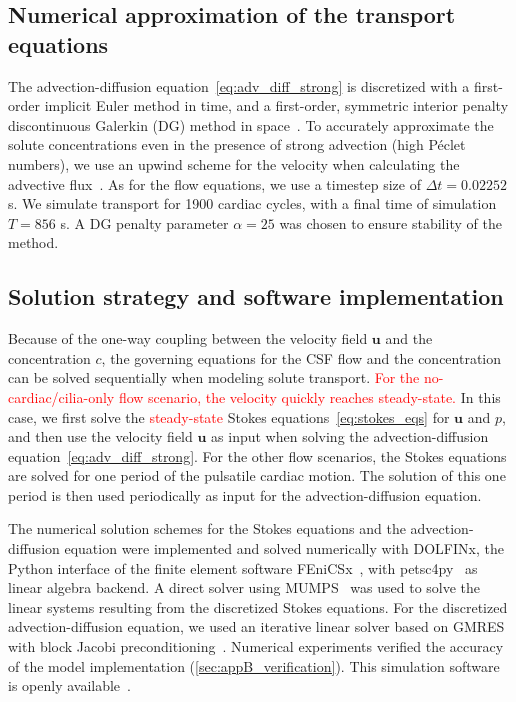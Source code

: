 \documentclass[fleqn]{wlscirep}
\newcommand{\uu}{\mathbf{u}}
\newcommand{\fixme}[1]{\textcolor{red}{#1}}
\begin{document}
\subsection*{Numerical approximation of the transport equations}
The advection-diffusion equation~\eqref{eq:adv_diff_strong} is discretized with a first-order implicit Euler method in time, and a first-order, symmetric interior penalty discontinuous Galerkin (DG) method in space~\cite{Arnold1982AnElements}. To accurately approximate the solute concentrations even in the presence of strong advection (high Péclet numbers), we use an upwind scheme for the velocity when calculating the advective flux~\cite{Patankar2018NumericalFlow}. As for the flow equations, we use a timestep size of $\Delta t = 0.02252$ s. We simulate transport for 1900 cardiac cycles, with a final time of simulation $T = 856$ s. A DG penalty parameter $\alpha = 25$ was chosen to ensure stability of the method. 

\subsection*{Solution strategy and software implementation}
Because of the one-way coupling between the velocity field $\uu$ and the concentration $c$, the governing equations for the CSF flow and the concentration can be solved sequentially when modeling solute transport. \fixme{For the no-cardiac/cilia-only flow scenario, the velocity quickly reaches steady-state.} In this case, we first solve the \fixme{steady-state} Stokes equations~\eqref{eq:stokes_eqs} for $\uu$ and $p$, and then use the velocity field $\uu$ as input when solving the advection-diffusion equation~\eqref{eq:adv_diff_strong}. For the other flow scenarios, the Stokes equations are solved for one period of the pulsatile cardiac motion. The solution of this one period is then used periodically as input for the advection-diffusion equation.

The numerical solution schemes for the Stokes equations and the advection-diffusion equation were implemented and solved numerically with DOLFINx, the Python interface of the finite element software FEniCSx~\cite{TheFEniCSProject2024FEniCSxDocumentation}, with petsc4py~\cite{Dalcin2011ParallelPython} as linear algebra backend. A direct solver using MUMPS~\cite{Amestoy2011Mumps} was used to solve the linear systems resulting from the discretized Stokes equations. For the discretized advection-diffusion equation, we used an iterative linear solver based on GMRES~\cite{Saad1986GMRES:Systems} with block Jacobi preconditioning~\cite{Jacobi1845UeberGleichungen}. Numerical experiments verified the accuracy of the model implementation (\cref{sec:appB_verification}). This simulation software is openly available~\cite{zenodo-link-to-all-code}. 
\end{document}
